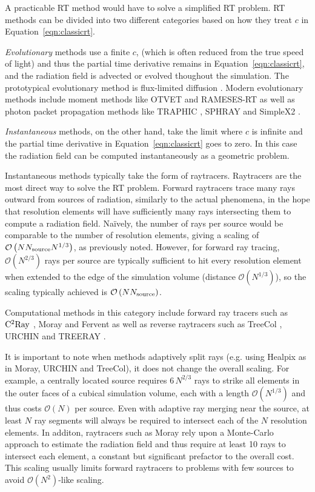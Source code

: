 \documentclass[fleq,usenatbib]{mnras}
\newcommand{\bigO}[1]{\mathcal{O}\left(#1\right)}
\newcommand{\NS}{N_{\rm source}}
\begin{document}
A practicable RT method would have to solve a simplified RT problem. RT 
methods can be divided into two different categories based on how they treat 
$c$ in Equation~\ref{eqn:classicrt}.

\textit{Evolutionary} methods use a 
finite $c$, (which is often reduced from the true speed of light) and thus the 
partial time derivative remains in Equation~\ref{eqn:classicrt}, and the 
radiation field is advected or evolved thoughout the simulation. The 
prototypical evolutionary method is flux-limited diffusion 
\citep{levermorePomraning81}. Modern evolutionary methods include 
moment methods like OTVET \citep{gnedinAbel01} and RAMESES-RT 
\citep{rosdahlEt13} as well as photon packet propagation methods like TRAPHIC 
\citep{pawlikSchaye08}, SPHRAY \citep{altayEt08} and SimpleX2 
\citep{paardekooperEt10}.

\textit{Instantaneous} methods,  on the other hand, take the limit where $c$ 
is infinite and the partial time derivative in Equation~\ref{eqn:classicrt} 
goes to zero. In this case the radiation field can be computed instantaneously 
as a geometric problem.

Instantaneous methods typically take the form of raytracers. Raytracers are 
the most direct way to solve the RT problem. Forward raytracers 
trace many rays outward from sources of radiation, similarly to the actual 
phenomena, in the hope that resolution elements will have sufficiently many 
rays intersecting them to compute a radiation field. Na\"ively, the number of 
rays per source would be comparable to the number of resolution elements, 
giving a scaling of $\bigO{N \NS N^{1/3}}$, as previously noted. However, for 
forward ray tracing, $\bigO{N^{2/3}}$ rays per source are typically sufficient 
to hit every resolution element when extended to the edge of the simulation 
volume (distance $\bigO{N^{1/3}}$), so the scaling typically achieved is 
$\bigO{N \NS}$.  

Computational methods in this category include forward 
ray tracers such as $\rm C^2Ray$ \citep{mellemaEt06a}, Moray 
\citep{wiseAbel11} and Fervent \citep{baczynskiEt15} as well as reverse 
raytracers such as TreeCol \citep{clarkEt12}, URCHIN \citep{altayTheuns13} and TREERAY \citep{HaidEt18}. 

It is important to note when methods adaptively split rays (e.g. using Healpix 
\citealt{gorskiEt05} as in Moray, URCHIN and TreeCol), it does not change the 
overall scaling.  For example, a centrally located source requires $6\, N^{2/3}$ 
rays to strike all elements in the outer faces of a cubical simulation volume, 
each with a length $\bigO{N^{1/3}}$ and thus costs $\bigO{N}$ per source. Even with adaptive ray merging near the 
source, at least $N$ ray segments will always be required to intersect each of the $N$ 
resolution elements. In additon, raytracers such as Moray rely upon a 
Monte-Carlo approach to estimate the radiation field and thus require at least 
10 rays to intersect each element, a constant but significant prefactor to the 
overall cost. This scaling usually limits forward raytracers to problems with 
few sources to avoid $\mathcal{O}(N^2)$-like scaling. 
\end{document}
